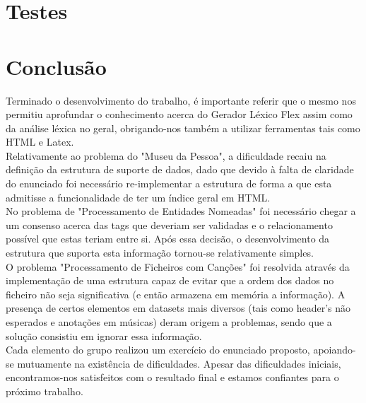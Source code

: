\documentclass[a4paper,10pt]{report}
\begin{document}
\chapter{Testes}


\chapter{Conclusão}
\label{cap:intro}
Terminado o desenvolvimento do trabalho, é importante referir que o mesmo nos permitiu aprofundar o conhecimento acerca do Gerador Léxico Flex assim como da análise léxica no geral, obrigando-nos também a utilizar ferramentas tais como HTML e Latex.\\
Relativamente ao problema do "Museu da Pessoa", a dificuldade recaiu na definição da estrutura de suporte de dados, dado que devido à falta de claridade do enunciado foi necessário re-implementar a estrutura de forma a que esta admitisse a funcionalidade de ter um índice geral em HTML.\\
No problema de "Processamento de Entidades Nomeadas" foi necessário chegar a um consenso acerca das tags que deveriam ser validadas e o relacionamento possível que estas teriam entre si. Após essa decisão, o desenvolvimento da estrutura que suporta esta informação tornou-se relativamente simples.\\
O problema "Processamento de Ficheiros com Canções" foi resolvida através da implementação de uma estrutura capaz de evitar que a ordem dos dados no ficheiro não seja significativa (e então armazena em memória a informação). A presença de certos elementos em datasets mais diversos (tais como header's não esperados e anotações em músicas) deram origem a problemas, sendo que a solução consistiu em ignorar essa informação. \\
Cada elemento do grupo realizou um exercício do enunciado proposto, apoiando-se mutuamente na existência de dificuldades. Apesar das dificuldades iniciais, encontramos-nos satisfeitos com o resultado final e estamos confiantes para o próximo trabalho.


\end{document}
